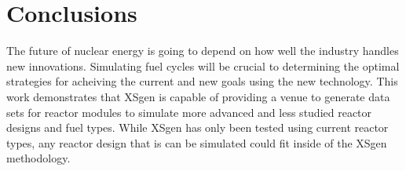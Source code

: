 \documentclass{article}
\begin{document}
\section{Conclusions}
The future of nuclear energy is going to depend on how well the industry handles new innovations. Simulating fuel cycles will be crucial to determining the optimal strategies for acheiving the current and new goals using the new technology. This work demonstrates that XSgen is capable of providing a venue to generate data sets for reactor modules to simulate more advanced and less studied reactor designs and fuel types. While XSgen has only been tested using current reactor types, any reactor design that is can be simulated could fit inside of the XSgen methodology.
\end{document}

